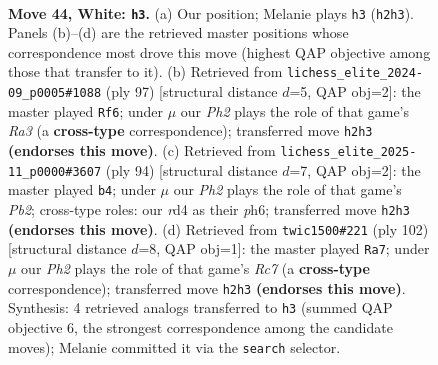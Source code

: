 \documentclass[11pt]{article}
\begin{document}
\clearpage

\begin{figure}[p]\centering
\begin{subfigure}{0.46\textwidth}\centering
\resizebox{\linewidth}{!}{%
\newchessgame
\chessboard[
  setfen={8/p2p3k/2p2K2/8/3r4/8/5P1P/8 w - - 0 44},
  showmover=false,
  pgfstyle=straightmove, color=movearrow, markmove={h2-h3}
]}
\caption{}
\end{subfigure}\hfill
\begin{subfigure}{0.46\textwidth}\centering
\resizebox{\linewidth}{!}{%
\newchessgame
\chessboard[
  setfen={8/6pp/r7/2k5/4K3/8/3R2PP/8 b - - 0 49},
  showmover=false,
  pgfstyle=straightmove, color=movearrow, markmove={a6-f6}
]}
\caption{}
\end{subfigure}
\\[4pt]
\begin{subfigure}{0.46\textwidth}\centering
\resizebox{\linewidth}{!}{%
\newchessgame
\chessboard[
  setfen={8/8/p5kp/1p1p4/5K2/8/PP6/8 w - - 0 48},
  showmover=false,
  pgfstyle=straightmove, color=movearrow, markmove={b2-b4}
]}
\caption{}
\end{subfigure}\hfill
\begin{subfigure}{0.46\textwidth}\centering
\resizebox{\linewidth}{!}{%
\newchessgame
\chessboard[
  setfen={8/2R5/6p1/p2k4/7K/1P6/6r1/8 w - - 0 52},
  showmover=false,
  pgfstyle=straightmove, color=movearrow, markmove={c7-a7}
]}
\caption{}
\end{subfigure}
\caption{\textbf{Move 44, White: \texttt{h3}.} (a) Our position; Melanie plays \texttt{h3} (\texttt{h2h3}). Panels (b)--(d) are the retrieved master positions whose correspondence most drove this move (highest QAP objective among those that transfer to it). (b) Retrieved from \texttt{lichess\_elite\_2024-09\_p0005\#1088} (ply 97) [structural distance $d$=5, QAP obj=2]: the master played \texttt{Rf6}; under $\mu$ our \emph{Ph2} plays the role of that game's \emph{Ra3} (a \textbf{cross-type} correspondence); transferred move \texttt{h2h3} \textbf{(endorses this move)}. (c) Retrieved from \texttt{lichess\_elite\_2025-11\_p0000\#3607} (ply 94) [structural distance $d$=7, QAP obj=2]: the master played \texttt{b4}; under $\mu$ our \emph{Ph2} plays the role of that game's \emph{Pb2}; cross-type roles: our \emph{r}d4 as their \emph{p}h6; transferred move \texttt{h2h3} \textbf{(endorses this move)}. (d) Retrieved from \texttt{twic1500\#221} (ply 102) [structural distance $d$=8, QAP obj=1]: the master played \texttt{Ra7}; under $\mu$ our \emph{Ph2} plays the role of that game's \emph{Rc7} (a \textbf{cross-type} correspondence); transferred move \texttt{h2h3} \textbf{(endorses this move)}. Synthesis: 4 retrieved analogs transferred to \texttt{h3} (summed QAP objective 6, the strongest correspondence among the candidate moves); Melanie committed it via the \texttt{search} selector.}
\label{fig:thought-m86}
\end{figure}
\end{document}

